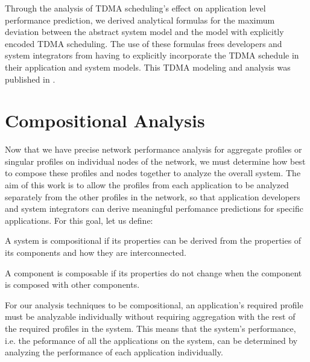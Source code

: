 Through the analysis of TDMA scheduling's effect on application level
performance prediction, we derived analytical formulas for the maximum
deviation between the abstract system model and the model with
explicitly encoded TDMA scheduling.  The use of these formulas frees
developers and system integrators from having to explicitly
incorporate the TDMA schedule in their application and system models.
This TDMA modeling and analysis was published in
\cite{ISIS_F6_ISORC_QOS:15}.

\newpage

\section{Compositional Analysis}
\label{sec:compositional_analysis}

Now that we have precise network performance analysis for aggregate
profiles or singular profiles on individual nodes of the network, we
must determine how best to compose these profiles and nodes together
to analyze the overall system.  The aim of this work is to allow the
profiles from each application to be analyzed separately from the
other profiles in the network, so that application developers and
system integrators can derive meaningful perfomance predictions for
specific applications.  For this goal, let us define:

\begin{definition}[Compositionality]\cite{sifakis2002}
  A system is compositional if its properties can be derived from
  the properties of its components and how they are interconnected.
\end{definition}

\begin{definition}[Composability]\cite{sifakis2002}
  A component is composable if its properties do not change
  when the component is composed with other components.
\end{definition}

For our analysis techniques to be compositional, an application's
required profile must be analyzable individually without requiring
aggregation with the rest of the required profiles in the system.
This means that the system's performance, i.e. the peformance of all
the applications on the system, can be determined by analyzing the
performance of each application individually.


